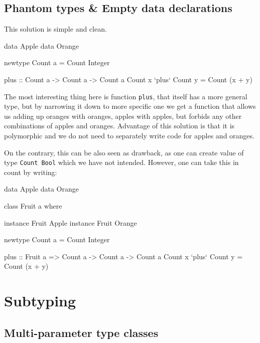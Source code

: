 \documentclass[11pt,oneside,draft]{fithesis2}
\theoremstyle{definition}
\begin{document}
\subsection{Phantom types \& Empty data declarations}

This solution is simple and clean.
\begin{code}
data Apple
data Orange

newtype Count a = Count Integer

plus :: Count a -> Count a -> Count a
Count x `plus` Count y = Count (x + y)
\end{code}
The most interesting thing here is function \texttt{plus}, that itself has a more general type, but
by narrowing it down to more specific one we get a function that allows us
adding up oranges with oranges, apples with apples, but forbids any other combinations
of apples and oranges. Advantage of this solution is that it is polymorphic
and we do not need to separately write code for apples and oranges.

On the contrary, this can be also seen as drawback, as one can create value
of type \texttt{Count Bool} which we have not intended. However,
one can take this in count by writing:
\begin{code}
data Apple
data Orange

class Fruit a where

instance Fruit Apple
instance Fruit Orange

newtype Count a = Count Integer

plus :: Fruit a => Count a -> Count a -> Count a
Count x `plus` Count y = Count (x + y)
\end{code}

%

\section{Subtyping}

\subsection{Multi-parameter type classes}
\end{document}
